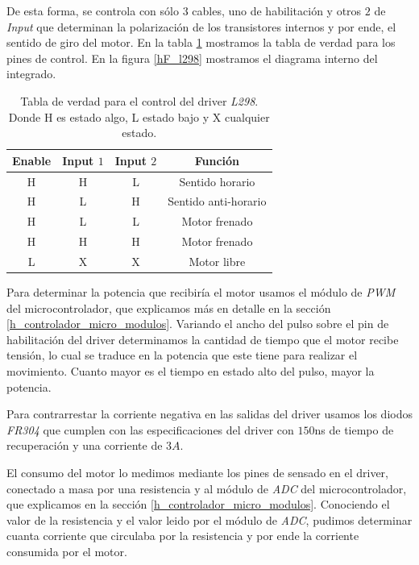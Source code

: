 De esta forma, se controla con s\'olo $3$ cables, uno de habilitaci\'on y otros $2$ de \emph{Input} que determinan
la polarizaci\'on de los transistores internos y por ende, el sentido de giro del motor.
En la tabla \ref{hT_l298} mostramos la tabla de verdad para los pines de control.
En la figura \ref{hF_l298} mostramos el diagrama interno del integrado.

\begin{table}
	\begin{center}
		\begin{tabular}{|c|c|c|c|}
			\hline
			Enable & Input $1$ & Input $2$ & Funci\'on \\
			\hline
			H & H & L & Sentido horario \\
			H & L & H & Sentido anti-horario \\
			H & L & L & Motor frenado \\
			H & H & H & Motor frenado \\
			L & X & X & Motor libre \\
			\hline
		\end{tabular}
	\end{center}
	\caption{Tabla de verdad para el control del driver \emph{L298}. Donde H es estado algo, L estado bajo y X cualquier estado.}
	\label{hT_l298}
\end{table}

Para determinar la potencia que recibir\'ia el motor usamos el m\'odulo de \emph{PWM} del microcontrolador, que explicamos m\'as en detalle en la
secci\'on \ref{h_controlador_micro_modulos}.
Variando el ancho del pulso sobre el pin de habilitaci\'on del driver determinamos la cantidad de tiempo que el motor recibe tensi\'on, lo cual
se traduce en la potencia que este tiene para realizar el movimiento.
Cuanto mayor es el tiempo en estado alto del pulso, mayor la potencia.

Para contrarrestar la corriente negativa en las salidas del driver usamos los diodos \emph{FR304} que cumplen con las especificaciones del driver
con $150$ns de tiempo de recuperaci\'on y una corriente de $3 A$.

El consumo del motor lo medimos mediante los pines de sensado en el driver, conectado a masa por una resistencia y al m\'odulo de \emph{ADC} del
microcontrolador, que explicamos en la secci\'on \ref{h_controlador_micro_modulos}.
Conociendo el valor de la resistencia y el valor leido por el m\'odulo de \emph{ADC}, pudimos determinar cuanta corriente que circulaba por la
resistencia y por ende la corriente consumida por el motor.

